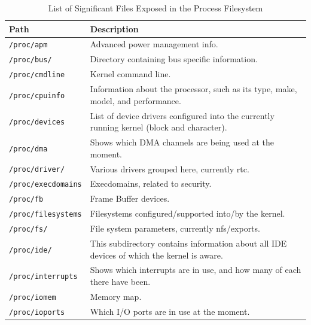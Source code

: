 \documentclass[a4paper]{article}
\begin{document}
\begin{table}
\renewcommand{\arraystretch}{1.25}
\centering
\caption{List of Significant Files Exposed in the Process Filesystem}  
\label{tbl:procfs}
\begin{tabular}{@{}lp{8cm}@{}}
\toprule
Path & Description\\
\midrule
\texttt{/proc/apm} &
Advanced power management info.\\

\texttt{/proc/bus/} &
Directory containing bus specific information.\\

\texttt{/proc/cmdline} &
Kernel command line. \\

\texttt{/proc/cpuinfo} &
Information about the processor, such as its type, make, model, and performance.\\

\texttt{/proc/devices} &
List of device drivers configured into the currently running kernel (block and character).\\

\texttt{/proc/dma} &
Shows which DMA channels are being used at the moment.\\

\texttt{/proc/driver/} &
Various drivers grouped here, currently rtc.\\

\texttt{/proc/execdomains} &
Execdomains, related to security.\\

\texttt{/proc/fb} &
Frame Buffer devices.\\

\texttt{/proc/filesystems} &
Filesystems configured/supported into/by the kernel.\\

\texttt{/proc/fs/} &
File system parameters, currently nfs/exports.\\

\texttt{/proc/ide/} &
This subdirectory contains information about all IDE devices of which the kernel is aware.\\

\texttt{/proc/interrupts} &
Shows which interrupts are in use, and how many of each there have been.\\

\texttt{/proc/iomem} &
Memory map.\\

\texttt{/proc/ioports} &
Which I/O ports are in use at the moment.\\


\end{tabular}
\end{table}
\end{document}
